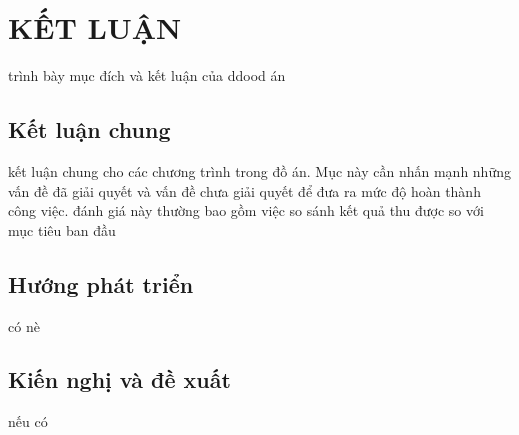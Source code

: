 \section*{KẾT LUẬN}
trình bày mục đích và kết luận của ddood án
\subsection*{Kết luận chung}
kết luận chung cho các chương trình trong đồ án. Mục này cần nhấn mạnh những vấn đề đã giải quyết và vấn đề chưa giải quyết để đưa ra mức độ hoàn thành công việc. đánh giá này thường bao gồm việc so sánh kết quả thu được so với mục tiêu ban đầu
\subsection*{Hướng phát triển}
có nè
\subsection*{Kiến nghị và đề xuất}
nếu có